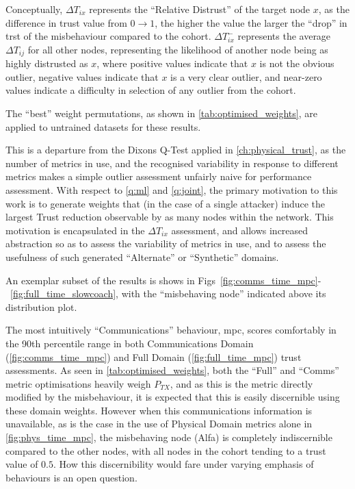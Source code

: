 Conceptually, $\Delta T_{ix}$ represents the ``Relative Distrust'' of the target node $x$, as the difference in trust value from $0\to1$, the higher the value the larger the ``drop'' in trst of the misbehaviour compared to the cohort. 
$\Delta T_{ix}^-$ represents the average $\Delta T_{ij}$ for all other nodes, representing the likelihood of another node being as highly distrusted as $x$, where positive values indicate that $x$ is not the obvious outlier, negative values indicate that $x$ is a very clear outlier, and near-zero values indicate a difficulty in selection of any outlier from the cohort.

The ``best'' weight permutations, as shown in \autoref{tab:optimised_weights}, are applied to untrained datasets for these results.

This is a departure from the Dixons Q-Test applied in \autoref{ch:physical_trust}, as the number of metrics in use, and the recognised variability in response to different metrics makes a simple outlier assessment unfairly naive for performance assessment. 
With respect to \ref{q:ml} and \ref{q:joint}, the primary motivation to this work is to generate weights that (in the case of a single attacker) induce the largest Trust reduction observable by as many nodes within the network.
This motivation is encapsulated in the $\Delta T_{ix}$ assessment, and allows increased abstraction so as to assess the variability of metrics in use, and to assess the usefulness of such generated ``Alternate'' or ``Synthetic'' domains.

An exemplar subset of the results is shows in Figs~\ref{fig:comms_time_mpc}-~\ref{fig:full_time_slowcoach}, with the ``misbehaving node'' indicated above its distribution plot.

The most intuitively ``Communications'' behaviour, \gls{mpc}, scores comfortably in the 90th percentile range in both Communications Domain (\autoref{fig:comms_time_mpc}) and Full Domain (\autoref{fig:full_time_mpc})  trust assessments. As seen in \autoref{tab:optimised_weights}, both the ``Full'' and ``Comms'' metric optimisations heavily weigh $P_{TX}$, and as this is the metric directly modified by the misbehaviour, it is expected that this is easily discernible using these domain weights.
However when this communications information is unavailable, as is the case in the use of Physical Domain metrics alone in \autoref{fig:phys_time_mpc}, the misbehaving node (Alfa) is completely indiscernible compared to the other nodes, with all nodes in the cohort tending to a trust value of $0.5$.
How this discernibility would fare under varying emphasis of behaviours is an open question.

